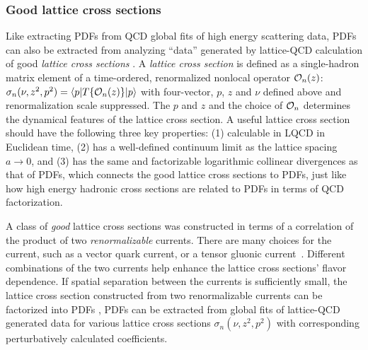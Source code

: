 \subsubsection{Good lattice cross sections}
Like extracting PDFs from QCD global fits of high energy scattering data, PDFs can also be extracted from analyzing ``data'' generated by lattice-QCD calculation of good {\it lattice cross sections} \cite{Ma:2014jla,Ma:2014jga}. A {\it lattice cross section} is defined as a single-hadron matrix element of a time-ordered, renormalized nonlocal operator ${\cal O}_n(z)$: ${\sigma}_{n}(\nu,z^2,p^2)=\langle p| {T}\{{\cal O}_n({z})\}|p\rangle$ with four-vector, $p$, $z$ and $\nu$ defined above and renormalization scale suppressed. The $p$ and $z$ and the choice of ${\cal O}_n$ determines the dynamical features of the lattice cross section. A useful lattice cross section should have the following three key properties: (1) calculable in LQCD in Euclidean time, (2) has a well-defined continuum limit as the lattice spacing $a\to 0$, and (3) has the same and factorizable logarithmic collinear divergences as that of PDFs, which connects the good lattice cross sections to PDFs, just like how high energy hadronic cross sections are related to PDFs in terms of QCD factorization.  

A class of {\it good} lattice cross sections was constructed in terms of a correlation of the product of two {\it renormalizable} currents.  There are many choices for the current, such as a vector quark current, or a tensor gluonic current~\cite{Ma:2017pxb}.  Different combinations of the two currents help enhance the lattice cross sections' flavor dependence.  If spatial separation between the currents is sufficiently small, the lattice cross section constructed from two renormalizable currents can be factorized into PDFs \cite{Ma:2017pxb},
PDFs can be extracted from global fits of lattice-QCD generated data for various lattice cross sections $\sigma_{n}(\nu,z^2,p^2)$ with corresponding perturbatively calculated coefficients.

